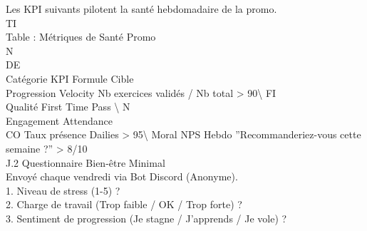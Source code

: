 Les KPI suivants pilotent la santé hebdomadaire de la promo.\\
\vspace{0.5em}
\vspace{0.5em}
\vspace{0.5em}
\vspace{0.5em}
TI\\
Table : Métriques de Santé Promo\\
\vspace{0.5em}
\vspace{0.5em}
\vspace{0.5em}
\vspace{0.5em}
N\\
DE\\
Catégorie   KPI             Formule                               Cible\\
Progression Velocity        Nb exercices validés / Nb total       \textgreater{} 90\textbackslash{}%
\vspace{0.5em}
\vspace{0.5em}
\vspace{0.5em}
\vspace{0.5em}
FI\\
Qualité     First Time Pass \textbackslash{}%
\vspace{0.5em}
\vspace{0.5em}
N\\
Engagement Attendance\\
CO        Taux présence Dailies                 \textgreater{} 95\textbackslash{}%
Moral       NPS Hebdo       ”Recommanderiez-vous cette semaine ?” \textgreater{} 8/10\\
\vspace{0.5em}
\vspace{0.5em}
\vspace{0.5em}
J.2 Questionnaire Bien-être Minimal\\
Envoyé chaque vendredi via Bot Discord (Anonyme).\\
\vspace{0.5em}
1. Niveau de stress (1-5) ?\\
\vspace{0.5em}
2. Charge de travail (Trop faible / OK / Trop forte) ?\\
\vspace{0.5em}
3. Sentiment de progression (Je stagne / J’apprends / Je vole) ?\\
